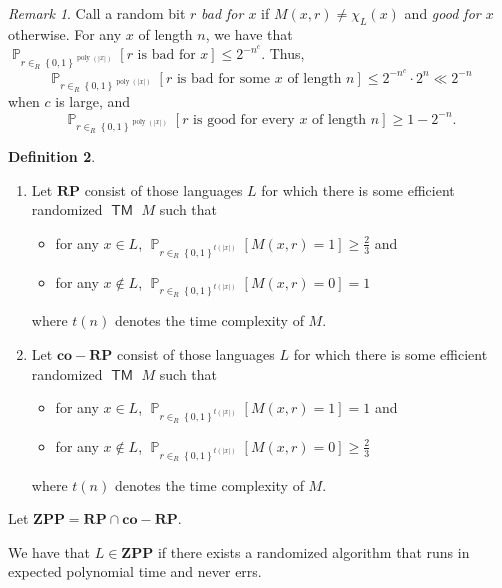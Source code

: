 \documentclass[10pt,letterpaper,cm]{nupset}
\theoremstyle{definition}
\newtheorem{definition}{Definition}[subsection]
\theoremstyle{theorem}
\theoremstyle{remark}
\newtheorem{remark}[definition]{Remark}
\newcommand{\1}{\mathbf{1}}
\newcommand{\0}{\vec 0}
\DeclareMathOperator{\pr}{\mathbb{P}}
\DeclareMathOperator{\TM}{\mathsf{TM}}
\DeclareMathOperator{\poly}{poly}
\begin{document}
\begin{remark}\label{good}
Call a random bit $r$ \textit{bad for $x$} if $M(x, r) \ne \chi_L(x)$ and \textit{good for $x$} otherwise. For any $x$ of length $n$, we have that  $\pr_{r\in_R \left\{0,1\right\}^{\poly(\left\lvert{x}\right\rvert)}}\left[r \text{ is bad for }x\right] \leq 2^{{-}n^c}$. Thus, $$\pr_{r\in_R \left\{0,1\right\}^{\poly(\left\lvert{x}\right\rvert)}}\left[r \text{ is bad for some }x \text{ of length }n\right] \leq 2^{{-}n^c}\cdot 2^n \ll 2^{{-}n}$$ when $c$ is large, and $$\pr_{r\in_R \left\{0,1\right\}^{\poly(\left\lvert{x}\right\rvert)}}\left[r \text{ is good for every }x \text{ of length }n\right] \geq 1 - 2^{{-}n}.$$
\end{remark}

\pagebreak

\begin{definition} $ $
\begin{enumerate}
\item Let $\mathbf{RP}$ consist of those languages $L$ for which there is some efficient randomized $\TM$ $M$ such that 
\begin{itemize}
\item for any $x\in L$, $\pr_{r\in_R \left\{0,1\right\}^{t(\left\lvert{x}\right\rvert)}}\left[M(x,r)=1\right] \geq \frac{2}{3}$ and
\item for any $x\notin L$, $\pr_{r\in_R \left\{0,1\right\}^{t(\left\lvert{x}\right\rvert)}}\left[M(x,r)=0\right] = 1$
\end{itemize} where $t(n)$ denotes the time complexity of $M$.
\item Let $\mathbf{co{-}RP}$ consist of those languages $L$ for which there is some efficient randomized $\TM$ $M$ such that 
\begin{itemize}
\item for any $x\in L$, $\pr_{r\in_R \left\{0,1\right\}^{t(\left\lvert{x}\right\rvert)}}\left[M(x,r)=1\right]= 1$ and
\item for any $x\notin L$, $\pr_{r\in_R \left\{0,1\right\}^{t(\left\lvert{x}\right\rvert)}}\left[M(x,r)=0\right] \geq \frac{2}{3}$
\end{itemize} where $t(n)$ denotes the time complexity of $M$.
\end{enumerate}
Let $\mathbf{ZPP} = \mathbf{RP} \cap \mathbf{co{-}RP}$.
\end{definition}

\smallskip


We have that $L \in \mathbf{ZPP}$ if there exists a randomized algorithm that runs in expected polynomial time and never errs. 
\end{document}
